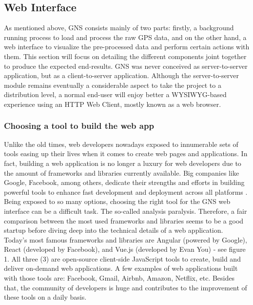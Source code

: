 
\subsection{Web Interface}
As mentioned above, GNS consists mainly of two parts: firstly, a background running process to load and process the raw GPS data, and on the other hand, a web interface to visualize the pre-processed data and perform certain actions with them. This section will focus on detailing the different components joint together to produce the expected end-results.
GNS was never conceived as server-to-server application, but as a client-to-server application. Although the server-to-server module remains eventually a considerable aspect to take the project to a distribution level, a normal end-user will enjoy better a WYSIWYG-based experience using an HTTP Web Client, mostly known as a web browser.

\vspace{1.0cm}
\noindent
\subsubsection{Choosing a tool to build the web app}

Unlike the old times, web developers nowadays exposed to innumerable sets of tools easing up their lives when it comes to create web pages and applications. In fact, building a web application is no longer a luxury for web developers due to the amount of frameworks and libraries currently available. Big companies like Google, Facebook, among others, dedicate their strengths and efforts in building powerful tools to enhance fast development and deployment across all platforms \cite{angular}.\\

Being exposed to so many options, choosing the right tool for the GNS web interface can be a difficult task. The so-called analysis paralysis. Therefore, a fair comparison between the most used frameworks and libraries seems to be a good startup before diving deep into the technical details of a web application. \\

Today’s most famous frameworks and libraries are Angular (powered by Google), React (developed by Facebook), and Vue.js (developed by Evan You) - see figure 1. All three (3) are open-source client-side JavaScript tools to create, build and deliver on-demand web applications. A few examples of web applications built with those tools are: Facebook, Gmail, Airbnb, Amazon, Netflix, etc. Besides that, the community of developers is huge and contributes to the improvement of these tools on a daily basis.\\


